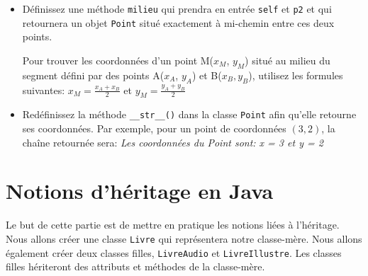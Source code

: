 \begin{Exercice}[15 minutes]
\begin{itemize}
\begin{conseil}
            Utilisez la fonction \lstinline{sqrt()} de la bibliothèque \lstinline{math} pour calculer la racine carrée. Pensez à importer la bibliothèque \lstinline{math}.
        \end{conseil}
        \item Définissez une méthode \lstinline{milieu} qui prendra en entrée \lstinline{self} et \lstinline{p2} et qui retournera un objet \lstinline{Point} situé exactement à mi-chemin entre ces deux points.
        \begin{conseil}
            Pour trouver les coordonnées d'un point M($x_M$, $y_M$) situé au milieu du segment défini par des points A($x_A$, $y_A$) et B($x_B, y_B$),
            utilisez les formules suivantes:
            $x_M = \frac{x_A + x_B}{2}$ et $y_M = \frac{y_A + y_B}{2}$
        \end{conseil}
        \item Redéfinissez la méthode \lstinline{__str__()} dans la classe \lstinline{Point} afin qu'elle retourne ses coordonnées. Par exemple, pour un point de coordonnées $(3,2)$, la chaîne retournée sera:
        \textit{Les coordonnées du Point sont: x = 3 et y = 2}
    \end{itemize}
\end{Exercice}
\begin{solution}
    
\end{solution}

\section{Notions d'héritage en Java}

Le but de cette partie est de mettre en pratique les notions liées à l'héritage. 
Nous allons créer une classe \lstinline{Livre} qui représentera notre classe-mère. Nous allons également créer deux classes filles, \lstinline{LivreAudio} et \lstinline{LivreIllustre}. Les classes filles hériteront des attributs et méthodes de la classe-mère. \\


